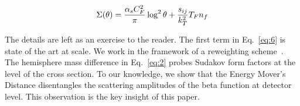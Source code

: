 \begin{equation}
  \Sigma(\theta) = \frac{\alpha_s C_F^2}{\pi} \log^2 \theta + \frac{s_{ij}}{k_T^2} T_F n_f
  \label{eq:8}
\end{equation}

The details are left as an exercise to the reader. The first term in
Eq.~\eqref{eq:6} is state of the art at scale. We work in the framework
of a reweighting
scheme~\cite{TPC:0905-HIGGS-Hard-Collinear-Invariant-Groomed-Gluon-Initiated-Showers-September-29-2026}.
The hemisphere mass difference in Eq.~\eqref{eq:2} probes Sudakov form
factors at the level of the cross section. To our knowledge, we show
that the Energy Mover's Distance disentangles the scattering amplitudes
of the beta function at detector level. This observation is the key
insight of this paper.

